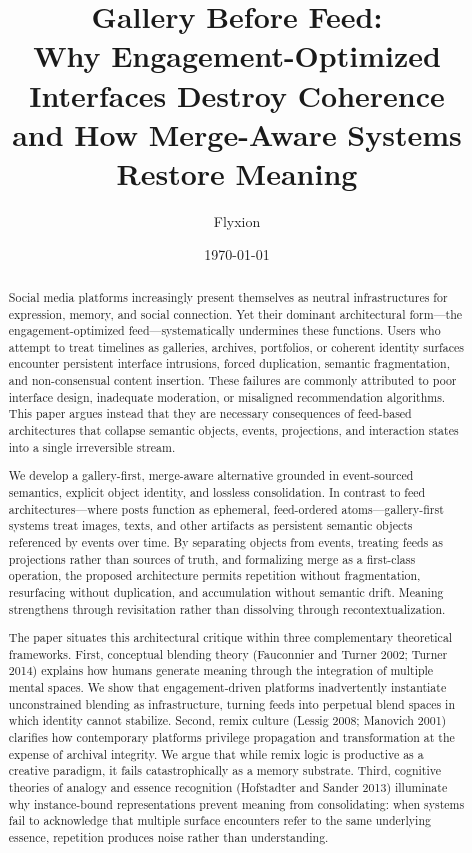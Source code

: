 \documentclass[11pt,oneside]{article}
\title{Gallery Before Feed:\\
Why Engagement-Optimized Interfaces Destroy Coherence\\
and How Merge-Aware Systems Restore Meaning}
\author{Flyxion}
\date{\today}
\begin{document}
\maketitle

\begin{abstract}
Social media platforms increasingly present themselves as neutral infrastructures for expression, memory, and social connection. Yet their dominant architectural form—the engagement-optimized feed—systematically undermines these functions. Users who attempt to treat timelines as galleries, archives, portfolios, or coherent identity surfaces encounter persistent interface intrusions, forced duplication, semantic fragmentation, and non-consensual content insertion. These failures are commonly attributed to poor interface design, inadequate moderation, or misaligned recommendation algorithms. This paper argues instead that they are necessary consequences of feed-based architectures that collapse semantic objects, events, projections, and interaction states into a single irreversible stream.

We develop a gallery-first, merge-aware alternative grounded in event-sourced semantics, explicit object identity, and lossless consolidation. In contrast to feed architectures—where posts function as ephemeral, feed-ordered atoms—gallery-first systems treat images, texts, and other artifacts as persistent semantic objects referenced by events over time. By separating objects from events, treating feeds as projections rather than sources of truth, and formalizing merge as a first-class operation, the proposed architecture permits repetition without fragmentation, resurfacing without duplication, and accumulation without semantic drift. Meaning strengthens through revisitation rather than dissolving through recontextualization.

The paper situates this architectural critique within three complementary theoretical frameworks. First, conceptual blending theory (Fauconnier and Turner 2002; Turner 2014) explains how humans generate meaning through the integration of multiple mental spaces. We show that engagement-driven platforms inadvertently instantiate unconstrained blending as infrastructure, turning feeds into perpetual blend spaces in which identity cannot stabilize. Second, remix culture (Lessig 2008; Manovich 2001) clarifies how contemporary platforms privilege propagation and transformation at the expense of archival integrity. We argue that while remix logic is productive as a creative paradigm, it fails catastrophically as a memory substrate. Third, cognitive theories of analogy and essence recognition (Hofstadter and Sander 2013) illuminate why instance-bound representations prevent meaning from consolidating: when systems fail to acknowledge that multiple surface encounters refer to the same underlying essence, repetition produces noise rather than understanding.


\end{abstract}
\end{document}
